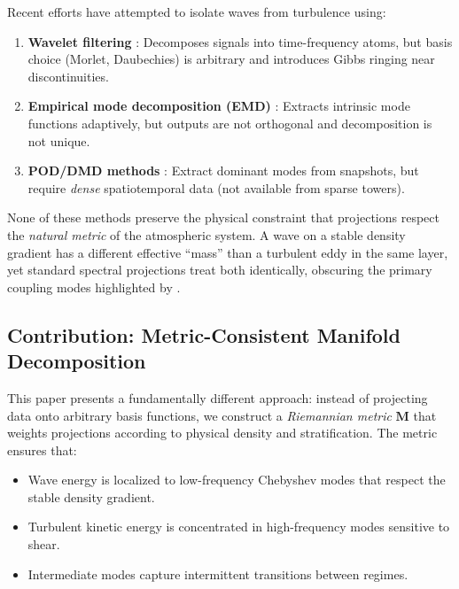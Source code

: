 \documentclass[11pt,a4paper]{article}
\begin{document}
Recent efforts have attempted to isolate waves from turbulence using:
\begin{enumerate}
  \item \textbf{Wavelet filtering} \citep{Vosper2006, Sun2015}: Decomposes signals into time-frequency atoms, but basis choice (Morlet, Daubechies) is arbitrary and introduces Gibbs ringing near discontinuities.
  \item \textbf{Empirical mode decomposition (EMD)} \citep{Huang1998}: Extracts intrinsic mode functions adaptively, but outputs are not orthogonal and decomposition is not unique.
  \item \textbf{POD/DMD methods} \citep{Schmid2010}: Extract dominant modes from snapshots, but require \emph{dense} spatiotemporal data (not available from sparse towers).
\end{enumerate}

None of these methods preserve the physical constraint that projections respect the \emph{natural metric} of the atmospheric system. A wave on a stable density gradient has a different effective ``mass'' than a turbulent eddy in the same layer, yet standard spectral projections treat both identically, obscuring the primary coupling modes highlighted by \citet{Sun2015}.

\subsection{Contribution: Metric-Consistent Manifold Decomposition}

This paper presents a fundamentally different approach: instead of projecting data onto arbitrary basis functions, we construct a \emph{Riemannian metric} $\mathbf{M}$ that weights projections according to physical density and stratification. The metric ensures that:
\begin{itemize}
  \item Wave energy is localized to low-frequency Chebyshev modes that respect the stable density gradient.
  \item Turbulent kinetic energy is concentrated in high-frequency modes sensitive to shear.
  \item Intermediate modes capture intermittent transitions between regimes.
\end{itemize}
\end{document}
